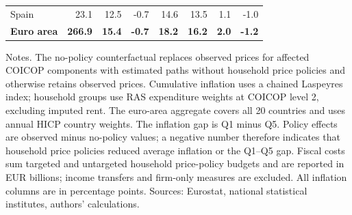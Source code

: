 \begin{table}[H]
{\begin{tabular}{lrrrrrrr}
\addlinespace
Spain & 23.1 & 12.5 & -0.7 & 14.6 & 13.5 & 1.1 & -1.0\\
\textbf{Euro area} & \textbf{266.9} & \textbf{15.4} & \textbf{-0.7} & \textbf{18.2} & \textbf{16.2} & \textbf{2.0} & \textbf{-1.2}\\
\bottomrule
\end{tabular}%
}
\begin{flushleft}
\footnotesize{Notes. The no-policy counterfactual replaces observed prices for affected COICOP components with estimated paths without household price policies and otherwise retains observed prices. Cumulative inflation uses a chained Laspeyres index; household groups use RAS expenditure weights at COICOP level 2, excluding imputed rent. The euro-area aggregate covers all 20 countries and uses annual HICP country weights. The inflation gap is Q1 minus Q5. Policy effects are observed minus no-policy values; a negative number therefore indicates that household price policies reduced average inflation or the Q1--Q5 gap. Fiscal costs sum targeted and untargeted household price-policy budgets and are reported in EUR billions; income transfers and firm-only measures are excluded. All inflation columns are in percentage points. Sources: Eurostat, national statistical institutes, authors' calculations.}
\end{flushleft}
\end{table}
